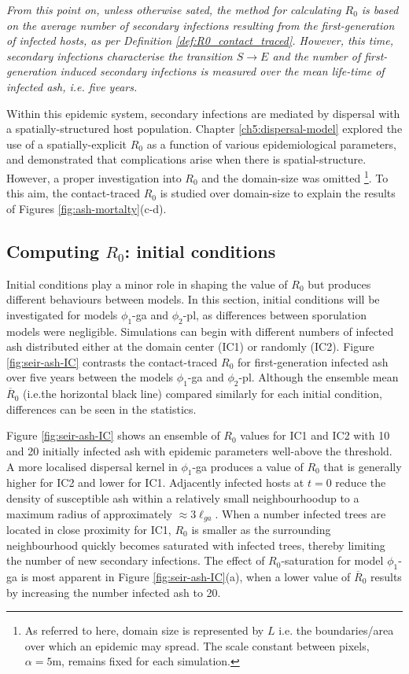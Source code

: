 \textit{From this point on, unless otherwise sated, the method for calculating $R_0$ is based on the average number of secondary infections resulting from the first-generation of infected hosts, as per Definition \ref{def:R0_contact_traced}. However, this time, secondary infections characterise the transition $S\rightarrow E$ and the number of first-generation induced secondary infections is measured over the mean life-time of infected ash, i.e. five years.}

Within this epidemic system, secondary infections are mediated by dispersal with a spatially-structured host population.
Chapter \ref{ch5:dispersal-model} explored the use of a spatially-explicit $R_0$ as a function of various epidemiological parameters,
and demonstrated that complications arise when there is spatial-structure.
However, a proper investigation into $R_0$ and the domain-size was omitted
\footnote{As referred to here, domain size is represented by $L$ i.e. the boundaries/area over which an epidemic may spread. The scale constant between pixels, $\alpha=5\mathrm{m}$, remains fixed for each simulation.}.
To this aim, the contact-traced $R_0$ is studied over domain-size to explain the results of Figures \ref{fig:ash-mortalty}(c-d).

\subsection{Computing $R_0$: initial conditions}

Initial conditions play a minor role in shaping the value of $R_0$ but produces different behaviours between models. 
In this section, initial conditions will be investigated for models $\phi_1$-ga and $\phi_2$-pl, as differences between sporulation models were negligible.
Simulations can begin with different numbers of infected ash distributed either at the domain center (IC1) or randomly (IC2).
Figure \ref{fig:seir-ash-IC} contrasts the contact-traced $R_0$ for first-generation infected ash over five years between the models $\phi_1$-ga and $\phi_2$-pl.
Although the ensemble mean $\overline{R}_0$ (i.e.the  horizontal black line) compared similarly for each initial condition, differences can be seen in the statistics.

Figure \ref{fig:seir-ash-IC} shows an ensemble of $R_0$ values for IC1 and IC2 with 10 and 20 initially infected ash with epidemic parameters well-above the threshold.
A more localised dispersal kernel in $\phi_1$-ga produces a value of $R_0$ that is generally higher for IC2 and lower for IC1.
Adjacently infected hosts at $t=0$ reduce the density of susceptible ash within a relatively small neighbourhood\textemdash up to a maximum radius of approximately $\approx 3\ell_{ga}$.
When a number infected trees are located in close proximity for IC1, $R_0$ is smaller as the surrounding neighbourhood quickly becomes saturated with infected trees, thereby limiting the number of new secondary infections.
The effect of $R_0$-saturation for model $\phi_1$-ga is most apparent in Figure \ref{fig:seir-ash-IC}(a), when a lower value of $\overline{R}_0$ results by increasing the number infected ash to 20.


